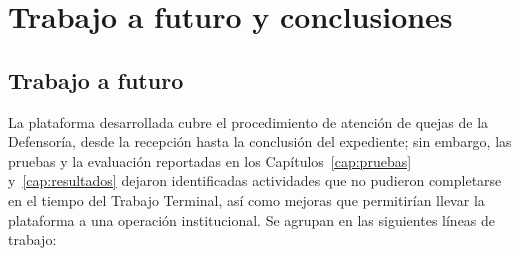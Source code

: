 \chapter{Trabajo a futuro y conclusiones}
\label{cap:futuro_conclusiones}

\section{Trabajo a futuro}
\label{sec:trabajo_futuro}
La plataforma desarrollada cubre el procedimiento de atención de quejas de la Defensoría, desde la recepción hasta la conclusión del expediente; sin embargo, las pruebas y la evaluación reportadas en los Capítulos~\ref{cap:pruebas} y~\ref{cap:resultados} dejaron identificadas actividades que no pudieron completarse en el tiempo del Trabajo Terminal, así como mejoras que permitirían llevar la plataforma a una operación institucional. Se agrupan en las siguientes líneas de trabajo:

